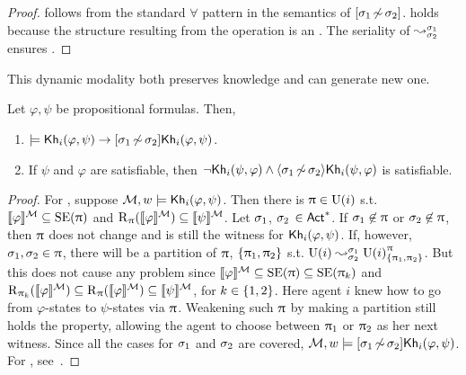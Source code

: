 \begin{proof}
 follows from the standard $\forall$ pattern in the semantics of $\refbox{\plan_1}{\plan_2}$.
 holds because the structure resulting from the operation is an \ults.
The seriality of $\splitstr{}{}{\plan_1}{\plan_2}$ ensures .
\end{proof}

This dynamic modality both preserves knowledge and can generate new one.

\medskip

\begin{proposition}\label{prop:ref-preserves-gains}
Let $\varphi,\psi$ be propositional formulas. Then,
\begin{enumerate}
\item\label{itm:preservesknowledge} $\models \khi(\varphi,\psi) \ra \refbox{\plan_1}{\plan_2}\khi(\varphi,\psi)$.
\item\label{itm:gainsknowledge} If $\psi$ and $\varphi$ are satisfiable, then $\neg\khi(\psi,\varphi) \wedge \refdiam{\plan_1}{\plan_2}\khi(\psi,\varphi)$ is satisfiable.
\end{enumerate}
\end{proposition}
\begin{proof}
For , suppose $\modults, w \models \khi(\varphi,\psi)$.
Then there is $\plans \in \Unc(i)$ s.t. $\truthset{\modults}{\varphi} \subseteq \stexec(\plans)$ and $\R_\plans(\truthset{\modults}{\varphi}) \subseteq \truthset{\modults}{\psi}$.
Let $\plan_1$, $\plan_2$ $\in \ACT^*$.
If $\plan_1 \not\in \plans$ or $\plan_2 \not\in \plans$, then $\plans$ does not change and is still the witness for $\khi(\varphi,\psi)$.
If, however, $\plan_1,\plan_2 \in \plans$, there will be a partition of $\plans$, $\{\plans_1,\plans_2\}$ s.t. $\splitstr{\Unc(i)}{\lmodel{\Unc(i)}{\plans}{\set{\plans_1,\plans_2}}}{\plan_1}{\plan_2}$.
But this does not cause any problem since $\truthset{\modults}{\varphi} \subseteq \stexec(\plans) \subseteq \stexec(\plans_k)$ and $\R_{\plans_k}(\truthset{\modults}{\varphi}) \subseteq \R_\plans(\truthset{\modults}{\varphi}) \subseteq \truthset{\modults}{\psi}$, for $k\in\set{1,2}$.
Here agent $i$ knew how to %
go from $\varphi$-states to $\psi$-states via $\plans$.
Weakening such $\plans$ by making a partition still holds the property, allowing the agent to choose between $\plans_1$ or $\plans_2$ as her next witness.
Since all the cases for $\plan_1$ and $\plan_2$ are covered, $\modults,w\models \refbox{\plan_1}{\plan_2}\khi(\varphi,\psi)$.
For , see~.
\end{proof}

